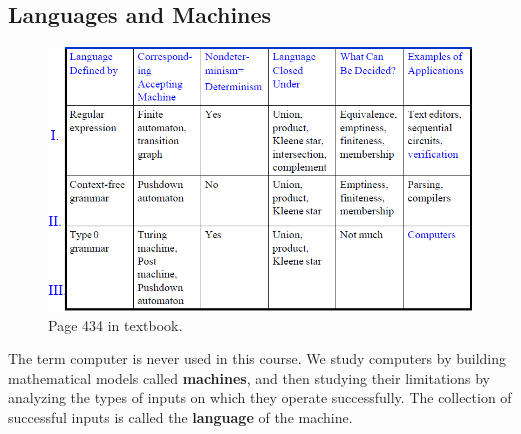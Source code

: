 \subsection{Languages and Machines}
\begin{figure}[!ht]
    \centering
    \includegraphics[width=\linewidth]{lectures/figures/page434.png}
    \caption{Page 434 in textbook.}
\end{figure}
The term computer is never used in this course. We study computers by building mathematical models called \textbf{machines}, and then studying their limitations by analyzing the types of inputs on which they operate successfully. The collection of successful inputs is called the \textbf{language} of the machine.